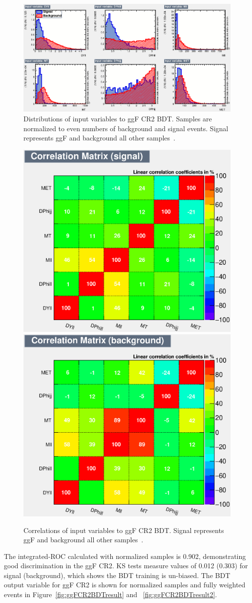 \begin{figure}[!htbp]
    \centering
    \includegraphics[width=0.7\linewidth]{Pictures/ggFCR2/variables_id_c1.eps}
    \caption{Distributions of input variables to ggF CR2 BDT. Samples are normalized to even numbers of background and signal events. Signal represents ggF and background all other samples~\cite{ourSupportNote}.}
    \label{fig:ggFCR2BDTinput}
\end{figure}
\begin{figure}[!htbp]
\centering
  \includegraphics[width=.45\linewidth]{Pictures/ggFCR2/CorrelationMatrixS.eps}
  \includegraphics[width=.45\linewidth]{Pictures/ggFCR2/CorrelationMatrixB.eps}
\caption{Correlations of input variables to ggF CR2 BDT. Signal represents ggF and background all other samples~\cite{ourSupportNote}.}
\label{fig:ggFCR2corrSB}
\end{figure}

The integrated-ROC calculated with normalized samples is 0.902, demonstrating good discrimination in the ggF CR2. KS tests measure values of 0.012 (0.303) for signal (background), which shows the BDT training is un-biased. The BDT output variable for ggF CR2 is shown for normalized samples and fully weighted events in Figure~\ref{fig:ggFCR2BDTresult} and ~\ref{fig:ggFCR2BDTresult2}. 

